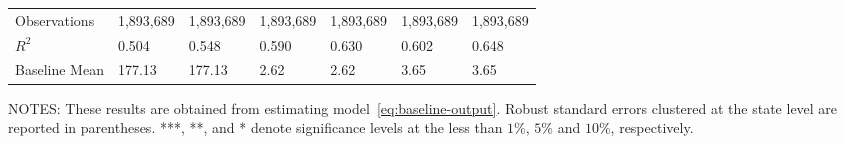 \begin{table}[H]
{\begin{tabular}{@{}lllllll@{}}
            Observations      & 1,893,689 & 1,893,689 & 1,893,689 & 1,893,689 & 1,893,689 & 1,893,689 \\
            $R^2$             & 0.504     & 0.548     & 0.590     & 0.630     & 0.602     & 0.648     \\
            Baseline Mean     & 177.13    & 177.13    & 2.62      & 2.62      & 3.65      & 3.65      \\ \bottomrule\bottomrule
        \end{tabular}%
    }
    \begin{minipage}{\columnwidth}
        \vspace{0.05in}
        \tiny NOTES: These results are obtained from estimating model~\ref{eq:baseline-output}. Robust standard errors clustered at the state level are reported in parentheses. ***, **, and * denote significance levels at the less than $1\%$, $5\%$ and $10\%$, respectively.
    \end{minipage}
\end{table}